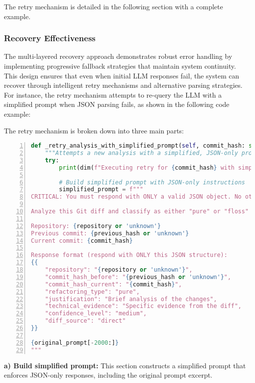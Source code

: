 The retry mechanism is detailed in the following section with a complete example.

\subsubsection{Recovery Effectiveness}
The multi-layered recovery approach demonstrates robust error handling by implementing progressive fallback strategies that maintain system continuity. This design ensures that even when initial LLM responses fail, the system can recover through intelligent retry mechanisms and alternative parsing strategies. For instance, the retry mechanism attempts to re-query the LLM with a simplified prompt when JSON parsing fails, as shown in the following code example:

The retry mechanism is broken down into three main parts:

\begin{lstlisting}[language=Python, numbers=left]
def _retry_analysis_with_simplified_prompt(self, commit_hash: str, previous_hash: str, repository: str, original_prompt: str) -> Optional[dict]:
    """Attempts a new analysis with a simplified, JSON-only prompt when the first fails."""
    try:
        print(dim(f"Executing retry for {commit_hash} with simplified prompt"))
        
        # Build simplified prompt with JSON-only instructions
        simplified_prompt = f"""
CRITICAL: You must respond with ONLY a valid JSON object. No other text before or after.

Analyze this Git diff and classify as either "pure" or "floss" refactoring.

Repository: {repository or 'unknown'}
Previous commit: {previous_hash or 'unknown'}  
Current commit: {commit_hash}

Response format (respond with ONLY this JSON structure):
{{
    "repository": "{repository or 'unknown'}",
    "commit_hash_before": "{previous_hash or 'unknown'}",
    "commit_hash_current": "{commit_hash}",
    "refactoring_type": "pure",
    "justification": "Brief analysis of the changes",
    "technical_evidence": "Specific evidence from the diff",
    "confidence_level": "medium",
    "diff_source": "direct"
}}

{original_prompt[-2000:]}  
"""
\end{lstlisting}

\textbf{a) Build simplified prompt:} This section constructs a simplified prompt that enforces JSON-only responses, including the original prompt excerpt.

